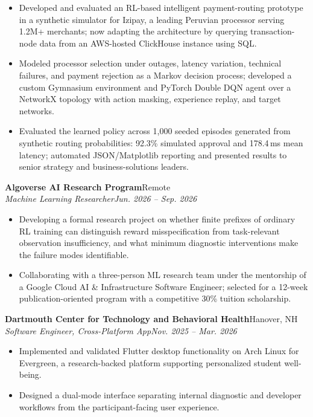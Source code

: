\documentclass[letterpaper,10pt]{article}
\newcommand{\subheading}[4]{%
  \textbf{#1}\hfill #2\\
  \textit{#3}\hfill \textit{#4}\par
  \vspace{-1.5pt}%
}
\begin{document}
\begin{itemize}
  \item Developed and evaluated an RL-based intelligent payment-routing
  prototype in a synthetic simulator for Izipay, a leading Peruvian processor
  serving 1.2M+ merchants; now adapting the architecture by querying
  transaction-node data from an AWS-hosted ClickHouse instance using SQL.

  \item Modeled processor selection under outages, latency variation, technical
  failures, and payment rejection as a Markov decision process; developed a
  custom Gymnasium environment and PyTorch Double DQN agent over a NetworkX
  topology with action masking, experience replay, and target networks.

  \item Evaluated the learned policy across 1,000 seeded episodes generated
  from synthetic routing probabilities: 92.3\% simulated approval and
  178.4\,ms mean latency; automated JSON/Matplotlib reporting and presented
  results to senior strategy and business-solutions leaders.
\end{itemize}

\subheading
  {Algoverse AI Research Program}{Remote}
  {Machine Learning Researcher}{Jun. 2026 -- Sep. 2026}

\begin{itemize}
  \item Developing a formal research project on whether finite prefixes of
  ordinary RL training can distinguish reward misspecification from
  task-relevant observation insufficiency, and what minimum diagnostic
  interventions make the failure modes identifiable.

  \item Collaborating with a three-person ML research team under the mentorship
  of a Google Cloud AI \& Infrastructure Software Engineer; selected for a
  12-week publication-oriented program with a competitive 30\% tuition
  scholarship.
\end{itemize}

\subheading
  {Dartmouth Center for Technology and Behavioral Health}{Hanover, NH}
  {Software Engineer, Cross-Platform App}{Nov. 2025 -- Mar. 2026}

\begin{itemize}
  \item Implemented and validated Flutter desktop functionality on Arch Linux
  for Evergreen, a research-backed platform supporting personalized student
  well-being.

  \item Designed a dual-mode interface separating internal diagnostic and
  developer workflows from the participant-facing user experience.
\end{itemize}
\end{document}
